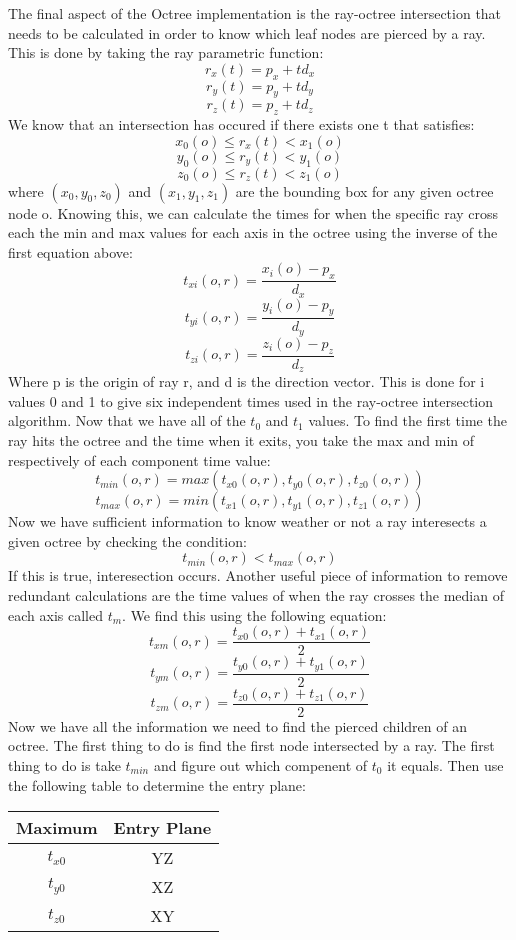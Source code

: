         \par The final aspect of the Octree implementation is the ray-octree intersection that needs to be calculated in order to know which leaf nodes are pierced by a ray. This is done by taking the ray parametric function: 
$$ r_x(t) = p_x + td_x$$
$$ r_y(t) = p_y + td_y$$
$$ r_z(t) = p_z + td_z$$
We know that an intersection has occured if there exists one t that satisfies:
$$ x_0(o) \leq r_x(t) < x_1(o)$$
$$ y_0(o) \leq r_y(t) < y_1(o) $$
$$ z_0(o) \leq r_z(t) < z_1(o) $$
where $(x_0, y_0, z_0)$ and $(x_1, y_1, z_1)$ are the bounding box for any given octree node o. Knowing this, we can calculate the times for when the specific ray cross each the min and max values for each axis in the octree using the inverse of the first equation above:
$$ t_{xi}(o,r) = \frac{x_i(o) - p_x}{d_x} $$
$$ t_{yi}(o,r) = \frac{y_i(o) - p_y}{d_y} $$
$$ t_{zi}(o,r) = \frac{z_i(o) - p_z}{d_z} $$
Where p is the origin of ray r, and d is the direction vector. This is done for i values 0 and 1 to give six independent times used in the ray-octree intersection algorithm. Now that we have all of the $ t_0 $ and $ t_1 $ values. To find the first time the ray hits the octree and the time when it exits, you take the max and min of respectively of each component time value:
$$ t_{min}(o,r) = max(t_{x0}(o,r), t_{y0}(o,r), t_{z0}(o,r)) $$
$$ t_{max}(o,r) = min(t_{x1}(o,r), t_{y1}(o,r), t_{z1}(o,r)) $$
Now we have sufficient information to know weather or not a ray interesects a given octree by checking the condition:
$$ t_{min}(o,r) < t_{max}(o,r) $$
If this is true, interesection occurs. Another useful piece of information to remove redundant calculations are the time values of when the ray crosses the median of each axis called $ t_m $. We find this using the following equation:
$$ t_{xm}(o,r) = \frac{t_{x0}(o,r) + t_{x1}(o,r)}{2} $$
$$ t_{ym}(o,r) = \frac{t_{y0}(o,r) + t_{y1}(o,r)}{2} $$
$$ t_{zm}(o,r) = \frac{t_{z0}(o,r) + t_{z1}(o,r)}{2} $$
Now we have all the information we need to find the pierced children of an octree. The first thing to do is find the first node intersected by a ray. The first thing to do is take $t_{min}$ and figure out which compenent of $ t_0 $ it equals. Then use the following table to determine the entry plane: \newline


\begin{tabular}{c|c}
  Maximum & Entry Plane \\
  \hline
  $t_{x0}$ & YZ \\
  $t_{y0}$ & XZ \\
  $t_{z0}$ & XY \\ \end{tabular}
  \newline

